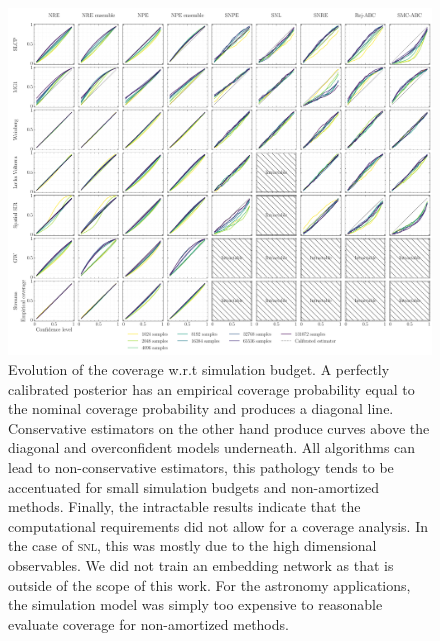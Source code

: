 \documentclass[twoside]{article}
\begin{document}
\begin{figure}[h!]
    \includegraphics[width=\textwidth]{figures/coverage_multi.pdf}
    \caption{Evolution of the coverage w.r.t simulation budget. A perfectly calibrated posterior has an empirical coverage probability equal to the nominal coverage probability and produces a diagonal line. Conservative estimators on the other hand produce curves above the diagonal and overconfident models underneath. All algorithms can lead to non-conservative estimators, this pathology tends to be accentuated for small simulation budgets and non-amortized methods.
    Finally, the intractable results indicate that the computational requirements did not allow for a coverage analysis. In the case of \textsc{snl}, this was mostly due to the high dimensional observables. We did not train an embedding network as that is outside of the scope of this work. For the astronomy applications, the simulation model was simply too expensive to reasonable evaluate coverage for non-amortized methods.
    }
    \label{fig:all_coverage_levels}
\end{figure}
\end{document}
